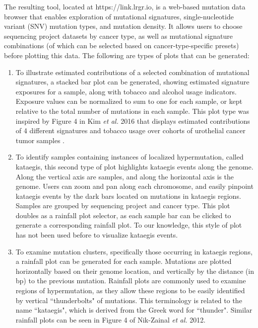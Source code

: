 \documentclass[12pt, letterpaper]{article}
\begin{document}
The resulting tool, located at https://link.lrgr.io, is a web-based mutation data browser that enables exploration of mutational signatures, single-nucleotide variant (SNV) mutation types, and mutation density.
It allows users to choose sequencing project datasets by cancer type, as well as mutational signature combinations (of which can be selected based on cancer-type-specific presets) before plotting this data. 
The following are types of plots that can be generated:
\begin{enumerate}
\item To illustrate estimated contributions of a selected combination of mutational signatures, a stacked bar plot can be generated, showing estimated signature exposures for a sample, along with tobacco and alcohol usage indicators.
    Exposure values can be normalized to sum to one for each sample, or kept relative to the total number of mutations in each sample.
    This plot type was inspired by Figure 4 in Kim \textit{et al.} 2016 that displays estimated contributions of 4 different signatures and tobacco usage over cohorts of urothelial cancer tumor samples \cite{kim2016somatic}.
    
\item To identify samples containing instances of localized hypermutation, called kataegis, this second type of plot highlights kataegis events along the genome.
    Along the vertical axis are samples, and along the horizontal axis is the genome.
    Users can zoom and pan along each chromosome, and easily pinpoint kataegis events by the dark bars located on mutations in kataegis regions.
    Samples are grouped by sequencing project and cancer type.
    This plot doubles as a rainfall plot selector, as each sample bar can be clicked to generate a corresponding rainfall plot.
    To our knowledge, this style of plot has not been used before to visualize kataegis events.
    
\item To examine mutation clusters, specifically those occurring in kataegis regions, a rainfall plot can be generated for each sample.
    Mutations are plotted horizontally based on their genome location, and vertically by the distance (in bp) to the previous mutation.
    Rainfall plots are commonly used to examine regions of hypermutation, as they allow these regions to be easily identified by vertical ``thunderbolts" of mutations. 
    This terminology is related to the name ``kataegis", which is derived from the Greek word for ``thunder".
    Similar rainfall plots can be seen in Figure 4 of Nik-Zainal \textit{et al.} 2012\cite{nik2012mutational}.
    

\end{enumerate}
\end{document}

